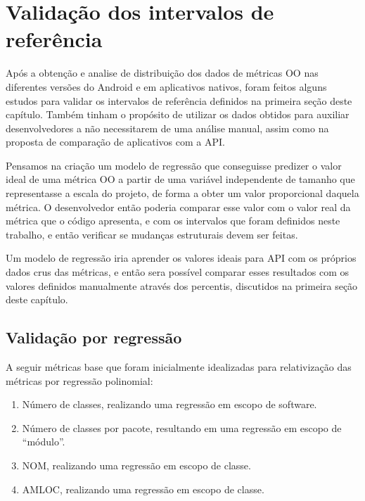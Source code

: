 \section{Validação dos intervalos de referência}

Após a obtenção e analise de distribuição dos dados de métricas OO nas diferentes versões do Android e em aplicativos nativos, foram feitos alguns estudos para validar os intervalos de referência definidos na primeira seção deste capítulo. Também tinham o propósito de utilizar os dados obtidos para auxiliar desenvolvedores a não necessitarem de uma análise manual, assim como na proposta de comparação de aplicativos com a API.

Pensamos na criação um modelo de regressão que conseguisse predizer o valor ideal de uma métrica OO a partir de uma variável independente de tamanho que representasse a escala do projeto, de forma a obter um valor proporcional daquela métrica. O desenvolvedor então poderia comparar esse valor com o valor real da métrica que o código apresenta, e com os intervalos que foram definidos neste trabalho, e então verificar se mudanças estruturais devem ser feitas.

Um modelo de regressão iria aprender os valores ideais para API com os próprios dados crus das métricas, e então sera possível comparar esses resultados com os valores definidos manualmente através dos percentis, discutidos na primeira seção deste capítulo.



\subsection{Validação por regressão}

A seguir métricas base que foram inicialmente idealizadas para relativização das métricas por regressão polinomial:

\begin{enumerate}
\item Número de classes, realizando uma regressão em escopo de software.
\item Número de classes por pacote, resultando em uma regressão em escopo de ``módulo''.
\item NOM, realizando uma regressão em escopo de classe.
\item AMLOC, realizando uma regressão em escopo de classe.
\end{enumerate}

